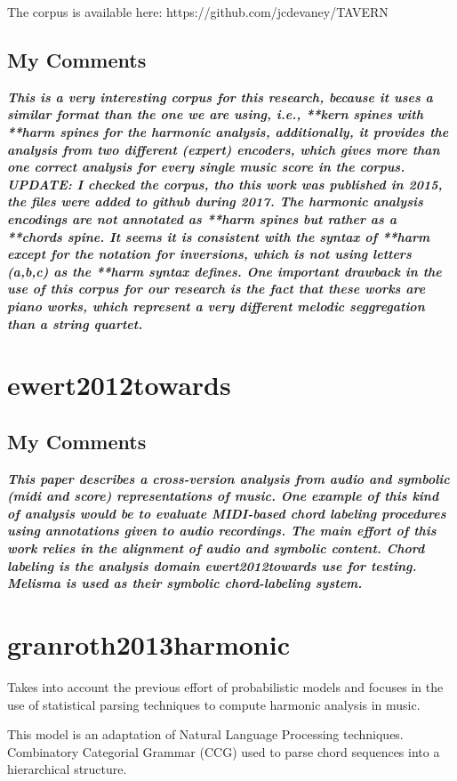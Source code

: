   The corpus is available here: https://github.com/jcdevaney/TAVERN

  \subsection{My Comments}
    \emph{\textbf{
      This is a very interesting corpus for this research, because it uses a similar format than the one we are using, i.e., **kern spines with **harm spines for the harmonic analysis, additionally, it provides the analysis from two different (expert) encoders, which gives more than one correct analysis for every single music score in the corpus. UPDATE: I checked the corpus, tho this work was published in 2015, the files were added to github during 2017. The harmonic analysis encodings are not annotated as **harm spines but rather as a **chords spine. It seems it is consistent with the syntax of **harm except for the notation for inversions, which is not using letters (a,b,c) as the **harm syntax defines. One important drawback in the use of this corpus for our research is the fact that these works are piano works, which represent a very different melodic seggregation than a string quartet.
    }}
\section{ewert2012towards }
  \subsection{My Comments}
    \emph{\textbf{
      This paper describes a cross-version analysis from audio and symbolic (midi and score) representations of music. One example of this kind of analysis would be to evaluate MIDI-based chord labeling procedures using annotations given to audio recordings. The main effort of this work relies in the alignment of audio and symbolic content. Chord labeling is the analysis domain ewert2012towards use for testing. Melisma is used as their symbolic chord-labeling system.
    }}
\section{granroth2013harmonic }
  Takes into account the previous effort of probabilistic models and focuses in the use of statistical parsing techniques to compute harmonic analysis in music.

  This model is an adaptation of Natural Language Processing techniques. Combinatory Categorial Grammar (CCG) used to parse chord sequences into a hierarchical structure.

